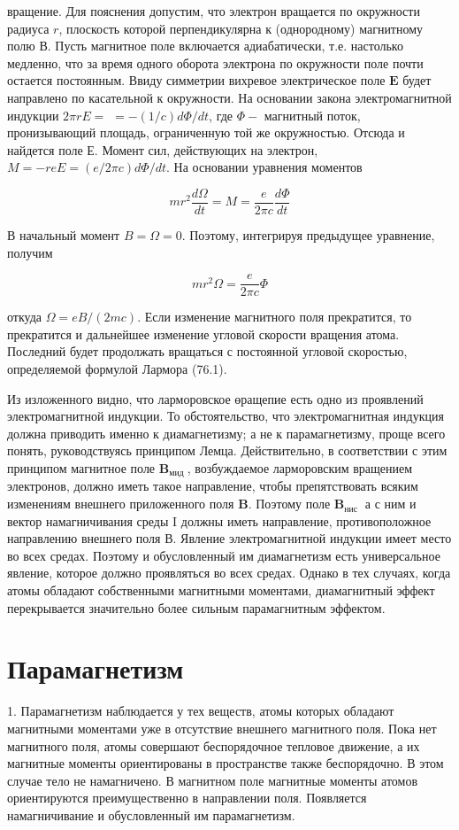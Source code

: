 \documentclass[12pt]{article}
\begin{document}
  вращение. Для пояснения допустим, что электрон вращается по окружности радиуса $r$, плоскость которой перпендикулярна к (однородному) магнитному полю В. Пусть магнитное поле включается адиабатически, т.е. настолько медленно, что за время одного оборота электрона по окружности поле почти остается постоянным. Ввиду симметрии вихревое электрическое поле $\mathbf{E}$ будет направлено по касательной к окружности. На основании закона электромагнитной индукции $2 \pi r E=$ $=-(1 / c) d \Phi / d t$, где $\Phi-$ магнитный поток, пронизывающий площадь, ограниченную той же окружностью. Отсюда и найдется поле Е. Момент сил, действующих на электрон, $M=-r e E=(e / 2 \pi c) d \Phi / d t$. На основании уравнения моментов

  $$
  m r^2 \frac{d \Omega}{d t}=M=\frac{e}{2 \pi c} \frac{d \Phi}{d t}
  $$


  В начальный момент $B=\Omega=0$. Поэтому, интегрируя предыдущее уравнение, получим

  $$
  m r^2 \Omega=\frac{e}{2 \pi c} \Phi
  $$


  откуда $\Omega=e B /(2 m c)$. Если изменение магнитного поля прекратится, то прекратится и дальнейшее изменение угловой скорости вращения атома. Последний будет продолжать вращаться с постоянной угловой скоростью, определяемой формулой Лармора (76.1).

  Из изложенного видно, что ларморовское өращепие есть одно из проявлений электромагнитной индукции. То обстоятельство, что электромагнитная индукция должна приводить именно к диамагнетизму; а не к парамагнетизму, проще всего понять, руководствуясь принципом Лемца. Действительно, в соответствии с этим принципом магнитное поле $\mathbf{B}_{\text {мид }}$, возбуждаемое ларморовским вращением электронов, должно иметь такое направление, чтобы препятствовать всяким изменениям внешнего приложенного поля $\mathbf{B}$. Поэтому поле $\mathbf{B}_{\text {нис }}$ а с ним и вектор намагничивания среды I должны иметь направление, противоположное направлению внешнего поля В. Явление электромагнитной индукции имеет место во всех средах. Поэтому и обусловленный им диамагнетизм есть универсальное явление, которое должно проявляться во всех средах. Однако в тех случаях, когда атомы обладают собственными магнитными моментами, диамагнитный эффект перекрывается значительно более сильным парамагнитным эффектом.

  \section{Парамагнетизм}
  1. Парамагнетизм наблюдается у тех веществ, атомы которых обладают магнитными моментами уже в отсутствие внешнего магнитного поля. Пока нет магнитного поля, атомы совершают беспорядочное тепловое движение, а их магнитные моменты ориентированы в пространстве также беспорядочно. В этом случае тело не намагничено. В магнитном поле магнитные моменты атомов ориентируются преимущественно в направлении поля. Появляется намагничивание и обусловленный им парамагнетизм.
\end{document}
